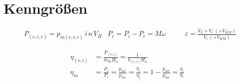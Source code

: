 \documentclass[english,threecolumn,color]{latex4ei/latex4ei_sheet}
\begin{document}
\section{Kenngrößen}
\begin{sectionbox}
	\begin{align*}
	&P_{(e,i,r)}=p_{m(e,i,r)} \, i\, n\, V_H & P_e=P_i-P_r= M \omega\qquad & \varepsilon=\frac{V_h+V_c\, (+V_{KM})}{V_c\, (+V_{KM})}
	\end{align*}
\end{sectionbox}

\begin{sectionbox}
	\begin{align*}
	\eta_{(e,i)}&=\frac{P_{(e,i)}}{\dot{m}_B \,  H_u}=\frac{1}{b_{(e,i)} H_u}\\
	\eta_m &= \frac{P_e}{P_i}=\frac{p_{me}}{p_{mi}}=\frac{\eta_{e}}{\eta_{i}} = 1-\frac{p_{mr}}{p_{mi}}=\frac{b_i}{b_e}
	\end{align*}
\end{sectionbox}
\end{document}
